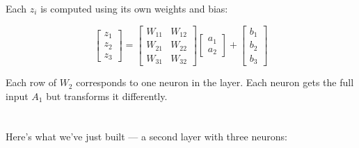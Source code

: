 \documentclass[11pt]{article}
\begin{document}
Each $z_i$ is computed using its own weights and bias:

\[
\begin{bmatrix}
z_1 \\
z_2 \\
z_3
\end{bmatrix}
=
\begin{bmatrix}
W_{11} & W_{12} \\
W_{21} & W_{22} \\
W_{31} & W_{32}
\end{bmatrix}
\begin{bmatrix}
a_1 \\
a_2
\end{bmatrix}
+
\begin{bmatrix}
b_1 \\
b_2 \\
b_3
\end{bmatrix}
\]

\begin{tcolorbox}[colback=green!5, colframe=green!60!black, title=Reminder]
Each row of $W_2$ corresponds to one neuron in the layer.  
Each neuron gets the full input $A_1$ but transforms it differently.
\end{tcolorbox}

\vspace{2em}

\section*{}

Here’s what we’ve just built — a second layer with three neurons:
\end{document}
